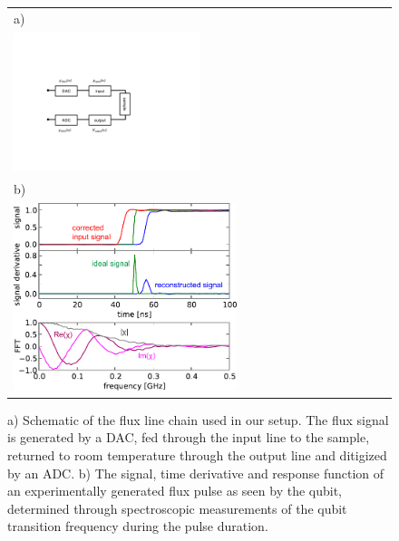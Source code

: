 \begin{figure}[ht!]
	\begin{center} 
	\begin{tabular}{l}
	 a) \\ \includegraphics[width=0.5\textwidth]{"./material/figures/measurement/fluxline_model"} \\
	 b) \\ \includegraphics[width=0.6\textwidth]{"./data/ct5/2011_04_04 - flux tomography/flux tomography"}
	 \end{tabular}
	\end{center}
	 \caption[]{a) Schematic of the flux line chain used in our setup. The flux signal is generated by a DAC, fed through the input line to the sample, returned to room temperature through the output line and ditigized by an ADC. b) The signal, time derivative and response function of an experimentally generated flux pulse as seen by the qubit, determined through spectroscopic measurements of the qubit transition frequency during the pulse duration.}
	 \label{fig:FluxLineResponseFunction}
\end{figure}


